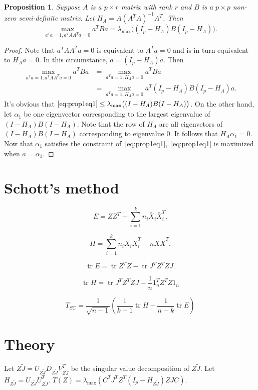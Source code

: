 \documentclass[review]{elsarticle}
\DeclareMathOperator{\mytr}{tr}
\theoremstyle{plain}
\newtheorem{proposition}{\quad\quad Proposition}
\theoremstyle{definition}
\theoremstyle{remark}
\begin{document}
\begin{proposition}\label{optProp}
    Suppose $A$ is a $p\times r$ matrix with rank $r$ and $B$ is a $p\times p$  non-zero semi-definite matrix.
    Let $H_A=A{(A^TA)}^{-1}A^T$.
    Then
    \begin{equation}
        \max_{a^T a=1, a^T A A^T a=0}a^T B a=
        \lambda_{\max}\big((I_p-H_A)B(I_p-H_A)\big).
    \end{equation}
\end{proposition}
\begin{proof}
    Note that $a^T A A^T a=0$ is equivalent to $A^T a=0$ and is in turn equivalent to $H_A a=0$.
    In this circumstance, $a= (I_p-H_A)a$.
    Then
    \begin{equation}\label{eq:prop1eq1}
        \begin{aligned}
        \max_{a^T a=1, a^T A A^T a=0}a^T B a
            &=
            \max_{a^T a=1, H_A a=0}a^T B a\\
            &=
        \max_{a^T a=1, H_A a=0}a^T(I_p-H_A) B (I_p-H_A)a.
        \end{aligned}
    \end{equation}
    It's obvious that $\eqref{eq:prop1eq1}\leq\lambda_{\max}\big((I-H_A)B(I-H_A)\big)$.
    On the other hand, let $\alpha_1$ be one eigenvector corresponding to the largest eigenvalue of $(I-H_A)B(I-H_A)$.
    Note that the row of $H_A$ are all eigenvetors of $(I-H_A)B(I-H_A)$ corresponding to eigenvalue $0$. It follows that $H_A\alpha_1=0$. Now that $\alpha_1$ satisfies the constraint of~\eqref{eq:prop1eq1},~\eqref{eq:prop1eq1} is maximized when $a=\alpha_1$.
    
\end{proof}

\section{Schott's method}

$$
E=ZZ^T-\sum_{i=1}^k n_i \bar{X}_i \bar{X}_i^T.
$$

$$
H=\sum_{i=1}^{k} n_i \bar{X}_i \bar{X}_i^T - n\bar{X}\bar{X}^T.
$$

$$
\mytr E = \mytr Z^T Z - \mytr J^T Z^T Z J.
$$


$$
\mytr H = \mytr J^T Z^T Z J - \frac{1}{n} 1_n^T Z^T Z 1_n
$$

$$
T_{SC}=\frac{1}{\sqrt{n-1}}(
\frac{1}{k-1}\mytr H-\frac{1}{n-k} \mytr E
)
$$


\section{Theory}
Let $Z\tilde{J}=U_{Z\tilde{J}}D_{Z\tilde{J}}V_{Z\tilde{J}}^T$ be the singular value decomposition of $Z\tilde{J}$. Let $H_{Z\tilde{J}}=U_{Z\tilde{J}}U_{Z\tilde{J}}^T$.
$T(Z) = \lambda_{\max}(C^T J^T Z^T (I_p-H_{Z\tilde{J}})ZJC)$.
\end{document}
